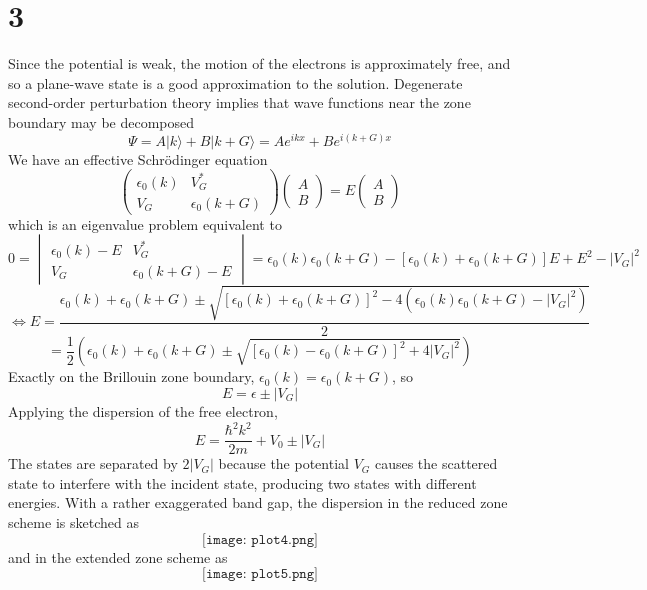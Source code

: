 \documentclass{article}
\begin{document}
\section*{3}
Since the potential is weak, the motion of the electrons is approximately free, and so a plane-wave state is a good approximation
to the solution.
Degenerate second-order perturbation theory implies that wave functions near the zone boundary may be decomposed
\[
  \Psi = A|k\rangle+B|k+G\rangle = Ae^{ikx}+Be^{i(k+G)x}
\]
We have an effective Schr\"odinger equation
\[
  \begin{pmatrix}
    \epsilon_{0}(k) & V_{G}^{*} \\
    V_{G} & \epsilon_{0}(k+G)
  \end{pmatrix}
  \begin{pmatrix}
    A \\
    B
  \end{pmatrix}
  =E
  \begin{pmatrix}
    A \\
    B
  \end{pmatrix}
\]
which is an eigenvalue problem equivalent to
\[
  0=
  \begin{vmatrix}
    \epsilon_{0}(k)-E & V_{G}^{*} \\
    V_{G} & \epsilon_{0}(k+G)-E
  \end{vmatrix}
  =\epsilon_{0}(k)\epsilon_{0}(k+G)-[\epsilon_{0}(k)+\epsilon_{0}(k+G)]E+E^{2}-|V_{G}|^{2}
\]
\[
  \Leftrightarrow E=\frac{\epsilon_{0}(k)+\epsilon_{0}(k+G)\pm
    \sqrt{[\epsilon_{0}(k)+\epsilon_{0}(k+G)]^{2}-4(\epsilon_{0}(k)\epsilon_{0}(k+G)-|V_{G}|^{2})}}{2}
\]
\[
  =\frac{1}{2}\left( \epsilon_{0}(k)+\epsilon_{0}(k+G)\pm
    \sqrt{[\epsilon_{0}(k)-\epsilon_{0}(k+G)]^{2}+4|V_{G}|^{2}} \right)
\]
Exactly on the Brillouin zone boundary, $\epsilon_{0}(k)=\epsilon_{0}(k+G)$, so
\[E=\epsilon\pm|V_{G}|\]
Applying the dispersion of the free electron,
\[
  E=\frac{\hbar^{2}k^{2}}{2m}+V_{0}\pm|V_{G}|
\]
The states are separated by $2|V_{G}|$ because the potential $V_{G}$ causes the scattered state to interfere with the incident state,
producing two states with different energies.
With a rather exaggerated band gap, the dispersion in the reduced zone scheme is sketched as
\[
  \texttt{[image: plot4.png]}
\]
and in the extended zone scheme as
\[
  \texttt{[image: plot5.png]}
\]
\end{document}
